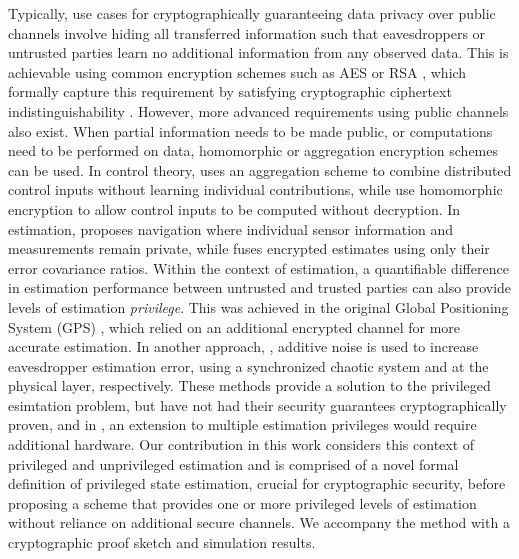 \documentclass[letterpaper, 10 pt, conference]{ieeeconf}
\begin{document}
Typically, use cases for cryptographically guaranteeing data privacy over public channels involve hiding all transferred information such that eavesdroppers or untrusted parties learn no additional information from any observed data. This is achievable using common encryption schemes such as AES \cite{gueronIntelAdvancedEncryption2010} or RSA \cite{rivestMethodObtainingDigital1978}, which formally capture this requirement by satisfying cryptographic ciphertext indistinguishability \cite[Ch. 3]{katzIntroductionModernCryptography2008}. However, more advanced requirements using public channels also exist. When partial information needs to be made public, or computations need to be performed on data, homomorphic or aggregation encryption schemes can be used. In control theory, \cite{alexandruPrivateWeightedSum2020} uses an aggregation scheme to combine distributed control inputs without learning individual contributions, while \cite{alexandruEncryptedCooperativeControl2019,farokhiSecurePrivateControl2017} use homomorphic encryption to allow control inputs to be computed without decryption. In estimation, \cite{risticPrivacyPreservingLocalizationUsing} proposes navigation where individual sensor information and measurements remain private, while \cite{risticSecureFastCovariance2020} fuses encrypted estimates using only their error covariance ratios. Within the context of estimation, a quantifiable difference in estimation performance between untrusted and trusted parties can also provide levels of estimation \textit{privilege}. This was achieved in the original Global Positioning System (GPS) \cite{grovesPrinciplesGNSSInertial2015}, which relied on an additional encrypted channel for more accurate estimation. In another approach, \cite{murguiaInformationTheoreticPrivacyChaos2020,leongUseArtificialNoise2018a}, additive noise is used to increase eavesdropper estimation error, using a synchronized chaotic system and at the physical layer, respectively. These methods provide a solution to the privileged esimtation problem, but have not had their security guarantees cryptographically proven, and in \cite{leongUseArtificialNoise2018a}, an extension to multiple estimation privileges would require additional hardware. Our contribution in this work considers this context of privileged and unprivileged estimation and is comprised of a novel formal definition of privileged state estimation, crucial for cryptographic security, before proposing a scheme that provides one or more privileged levels of estimation without reliance on additional secure channels. We accompany the method with a cryptographic proof sketch and simulation results.
\end{document}
